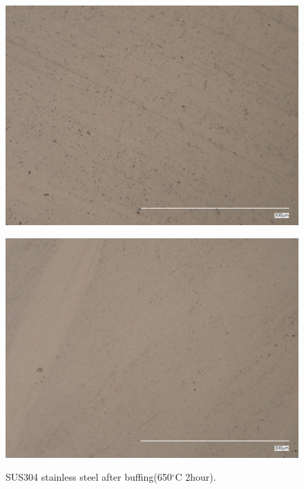\begin{figure}[htbp]
    \begin{minipage}[htbp]{0.45\linewidth}
      \centering
      \includegraphics[keepaspectratio, scale=0.07]{fig/241218_304650C2h_3um.jpg}
      \label{fig:6503um}
    \end{minipage}
    \begin{minipage}[htbp]{0.45\linewidth}
      \centering
      \includegraphics[keepaspectratio, scale=0.07]{fig/241218_304650C2h_1um.jpg}
      \label{fig:6501um}
    \end{minipage}
    \centering
    \caption{SUS304 stainless steel after buffing(650$^\circ$C 2hour).}
    \label{fig:304650Buff}
\end{figure}
